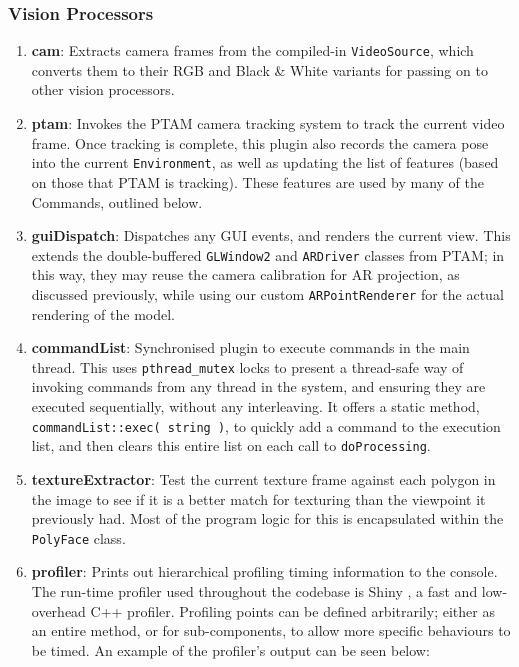 \documentclass[a4paper,10pt]{article}
\begin{document}
\subsubsection{Vision Processors}
\begin{enumerate}
\item{\textbf{cam}: Extracts camera frames from the compiled-in \texttt{VideoSource}, which converts them to their RGB and Black \& White variants for passing on to other vision processors.}
\item{\textbf{ptam}: Invokes the PTAM camera tracking system to track the current video frame. Once tracking is complete, this plugin also records the camera pose into the current \texttt{Environment}, as well as updating the list of features (based on those that PTAM is tracking). These features are used by many of the Commands, outlined below.}
\item{\textbf{guiDispatch}: Dispatches any GUI events, and renders the current view. This extends the double-buffered \texttt{GLWindow2} and \texttt{ARDriver} classes from PTAM; in this way, they may reuse the camera calibration for AR projection, as discussed previously, while using our custom \texttt{ARPointRenderer} for the actual rendering of the model.}
\item{\textbf{commandList}: Synchronised plugin to execute commands in the main thread. This uses \texttt{pthread\_mutex} locks to present a thread-safe way of invoking commands from any thread in the system, and ensuring they are executed sequentially, without any interleaving. It offers a static method, \texttt{commandList::exec( string )}, to quickly add a command to the execution list, and then clears this entire list on each call to \texttt{doProcessing}.}
\item{\textbf{textureExtractor}: Test the current texture frame against each polygon in the image to see if it is a better match for texturing than the viewpoint it previously had. Most of the program logic for this is encapsulated within the \texttt{PolyFace} class.}
\item{\textbf{profiler}: Prints out hierarchical profiling timing information to the console. The run-time profiler used throughout the codebase is Shiny \cite{shiny}, a fast and low-overhead C++ profiler. Profiling points can be defined arbitrarily; either as an entire method, or for sub-components, to allow more specific behaviours to be timed. An example of the profiler's output can be seen below:

}
\end{enumerate}
\end{document}
